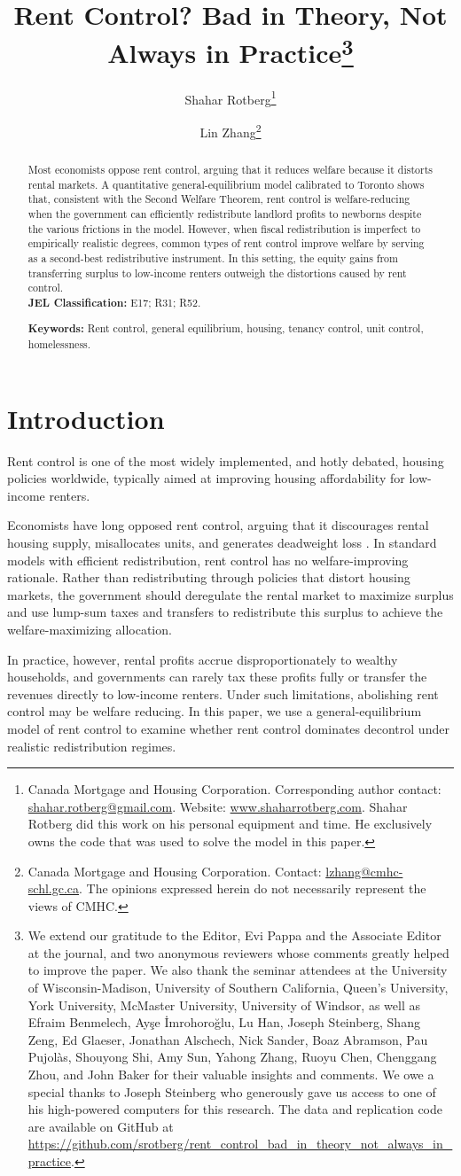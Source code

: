 \documentclass[parskip=full]{article}
\title{\vspace{-1.8cm}Rent Control? Bad in Theory, Not Always in Practice\footnote{We extend our gratitude to the Editor, Evi Pappa and the Associate Editor at the journal, and two anonymous reviewers whose comments greatly helped to improve the paper. We also thank the seminar attendees at the University of Wisconsin-Madison, University of Southern California, Queen's University, York University, McMaster University, University of Windsor, as well as Efraim Benmelech, Ay\c{s}e \.{I}mrohoro\u{g}lu, Lu Han, Joseph Steinberg, Shang Zeng, Ed Glaeser, Jonathan Alschech, Nick Sander, Boaz Abramson, Pau Pujol\`as, Shouyong Shi, Amy Sun, Yahong Zhang, Ruoyu Chen, Chenggang Zhou, and John Baker for their valuable insights and comments. We owe a special thanks to Joseph Steinberg who generously gave us access to one of his high-powered computers for this research. The data and replication code are available on GitHub at \url{https://github.com/srotberg/rent_control_bad_in_theory_not_always_in_practice}.}}
\author{Shahar Rotberg\footnote{Canada Mortgage and Housing Corporation. Corresponding author contact: \url{shahar.rotberg@gmail.com}. Website: \url{www.shaharrotberg.com}. Shahar Rotberg did this work on his personal equipment and time. He exclusively owns the code that was used to solve the model in this paper.} \and Lin Zhang\footnote{Canada Mortgage and Housing Corporation. Contact: \url{lzhang@cmhc-schl.gc.ca}. The opinions expressed herein do not necessarily represent the views of CMHC.}}
\begin{document}
\maketitle

\begin{abstract}
\onehalfspacing

\noindent Most economists oppose rent control, arguing that it reduces welfare because it distorts rental markets. A quantitative general-equilibrium model calibrated to Toronto shows that, consistent with the Second Welfare Theorem, rent control is welfare-reducing when the government can efficiently redistribute landlord profits to newborns despite the various frictions in the model. However, when fiscal redistribution is imperfect to empirically realistic degrees, common types of rent control improve welfare by serving as a second-best redistributive instrument. In this setting, the equity gains from transferring surplus to low-income renters outweigh the distortions caused by rent control.
\\[1.5ex]

\noindent \textbf{JEL Classification:} E17; R31; R52.

\noindent \textbf{Keywords:} Rent control, general equilibrium, housing, tenancy control, unit control, homelessness.
\end{abstract}

\section{Introduction}

Rent control is one of the most widely implemented, and hotly debated, housing policies worldwide, typically aimed at improving housing affordability for low-income renters.

Economists have long opposed rent control, arguing that it discourages rental housing supply, misallocates units, and generates deadweight loss \citep{gl-2003}. In standard models with efficient redistribution, rent control has no welfare-improving rationale. Rather than redistributing through policies that distort housing markets, the government should deregulate the rental market to maximize surplus and use lump-sum taxes and transfers to redistribute this surplus to achieve the welfare-maximizing allocation.

In practice, however, rental profits accrue disproportionately to wealthy households, and governments can rarely tax these profits fully or transfer the revenues directly to low-income renters. Under such limitations, abolishing rent control may be welfare reducing. In this paper, we use a general-equilibrium model of rent control to examine whether rent control dominates decontrol under realistic redistribution regimes.
\end{document}
